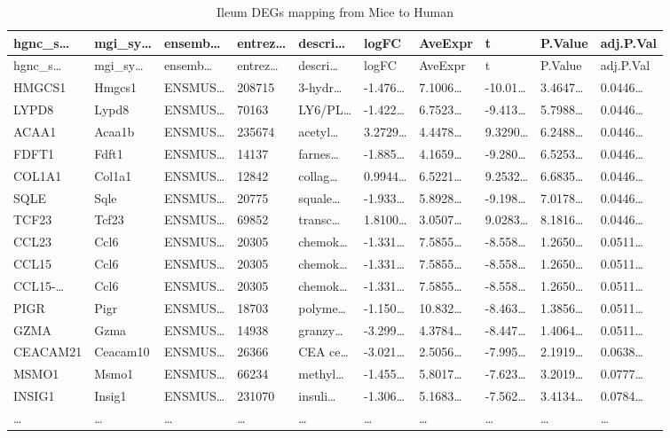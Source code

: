 \documentclass[
]{article}
\begin{document}
\begin{longtable}[]{@{}llllllllll@{}}
\caption{\label{tab:Ileum-DEGs-mapping-from-Mice-to-Human}Ileum DEGs mapping from Mice to Human}\tabularnewline
\toprule
hgnc\_s\ldots{} & mgi\_sy\ldots{} & ensemb\ldots{} & entrez\ldots{} & descri\ldots{} & logFC & AveExpr & t & P.Value & adj.P.Val\tabularnewline
\midrule
\endfirsthead
\toprule
hgnc\_s\ldots{} & mgi\_sy\ldots{} & ensemb\ldots{} & entrez\ldots{} & descri\ldots{} & logFC & AveExpr & t & P.Value & adj.P.Val\tabularnewline
\midrule
\endhead
HMGCS1 & Hmgcs1 & ENSMUS\ldots{} & 208715 & 3-hydr\ldots{} & -1.476\ldots{} & 7.1006\ldots{} & -10.01\ldots{} & 3.4647\ldots{} & 0.0446\ldots{}\tabularnewline
LYPD8 & Lypd8 & ENSMUS\ldots{} & 70163 & LY6/PL\ldots{} & -1.422\ldots{} & 6.7523\ldots{} & -9.413\ldots{} & 5.7988\ldots{} & 0.0446\ldots{}\tabularnewline
ACAA1 & Acaa1b & ENSMUS\ldots{} & 235674 & acetyl\ldots{} & 3.2729\ldots{} & 4.4478\ldots{} & 9.3290\ldots{} & 6.2488\ldots{} & 0.0446\ldots{}\tabularnewline
FDFT1 & Fdft1 & ENSMUS\ldots{} & 14137 & farnes\ldots{} & -1.885\ldots{} & 4.1659\ldots{} & -9.280\ldots{} & 6.5253\ldots{} & 0.0446\ldots{}\tabularnewline
COL1A1 & Col1a1 & ENSMUS\ldots{} & 12842 & collag\ldots{} & 0.9944\ldots{} & 6.5221\ldots{} & 9.2532\ldots{} & 6.6835\ldots{} & 0.0446\ldots{}\tabularnewline
SQLE & Sqle & ENSMUS\ldots{} & 20775 & squale\ldots{} & -1.933\ldots{} & 5.8928\ldots{} & -9.198\ldots{} & 7.0178\ldots{} & 0.0446\ldots{}\tabularnewline
TCF23 & Tcf23 & ENSMUS\ldots{} & 69852 & transc\ldots{} & 1.8100\ldots{} & 3.0507\ldots{} & 9.0283\ldots{} & 8.1816\ldots{} & 0.0446\ldots{}\tabularnewline
CCL23 & Ccl6 & ENSMUS\ldots{} & 20305 & chemok\ldots{} & -1.331\ldots{} & 7.5855\ldots{} & -8.558\ldots{} & 1.2650\ldots{} & 0.0511\ldots{}\tabularnewline
CCL15 & Ccl6 & ENSMUS\ldots{} & 20305 & chemok\ldots{} & -1.331\ldots{} & 7.5855\ldots{} & -8.558\ldots{} & 1.2650\ldots{} & 0.0511\ldots{}\tabularnewline
CCL15-\ldots{} & Ccl6 & ENSMUS\ldots{} & 20305 & chemok\ldots{} & -1.331\ldots{} & 7.5855\ldots{} & -8.558\ldots{} & 1.2650\ldots{} & 0.0511\ldots{}\tabularnewline
PIGR & Pigr & ENSMUS\ldots{} & 18703 & polyme\ldots{} & -1.150\ldots{} & 10.832\ldots{} & -8.463\ldots{} & 1.3856\ldots{} & 0.0511\ldots{}\tabularnewline
GZMA & Gzma & ENSMUS\ldots{} & 14938 & granzy\ldots{} & -3.299\ldots{} & 4.3784\ldots{} & -8.447\ldots{} & 1.4064\ldots{} & 0.0511\ldots{}\tabularnewline
CEACAM21 & Ceacam10 & ENSMUS\ldots{} & 26366 & CEA ce\ldots{} & -3.021\ldots{} & 2.5056\ldots{} & -7.995\ldots{} & 2.1919\ldots{} & 0.0638\ldots{}\tabularnewline
MSMO1 & Msmo1 & ENSMUS\ldots{} & 66234 & methyl\ldots{} & -1.455\ldots{} & 5.8017\ldots{} & -7.623\ldots{} & 3.2019\ldots{} & 0.0777\ldots{}\tabularnewline
INSIG1 & Insig1 & ENSMUS\ldots{} & 231070 & insuli\ldots{} & -1.306\ldots{} & 5.1683\ldots{} & -7.562\ldots{} & 3.4134\ldots{} & 0.0784\ldots{}\tabularnewline
\ldots{} & \ldots{} & \ldots{} & \ldots{} & \ldots{} & \ldots{} & \ldots{} & \ldots{} & \ldots{} & \ldots{}\tabularnewline
\bottomrule
\end{longtable}
\end{document}
